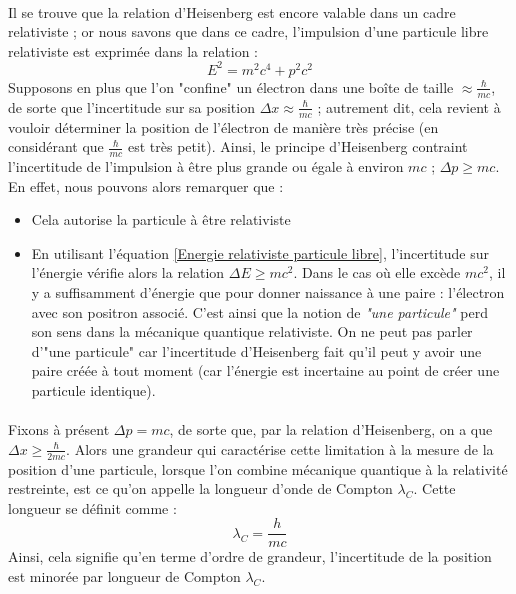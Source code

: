 \documentclass[../Notes de cours]{subfiles}
\begin{document}
\paragraph{} Il se trouve que la relation d'Heisenberg est encore valable dans un cadre relativiste ; or nous savons que dans ce cadre, l'impulsion d'une particule libre relativiste est exprimée dans la relation : 
\begin{equation}
    \label{Energie relativiste particule libre}
    E^2 = m^2 c^4 + p^2 c^2
\end{equation}
\newline Supposons en plus que l'on "confine" un électron dans une boîte de taille $\approx \frac{\hbar}{mc}$, de sorte que l'incertitude sur sa position $\Delta x \approx \frac{\hbar}{mc}$ ; autrement dit, cela revient à vouloir déterminer la position de l'électron de manière très précise (en considérant que $\frac{\hbar}{mc}$ est très petit).
\newline Ainsi, le principe d'Heisenberg contraint l'incertitude de l'impulsion à être plus grande ou égale à environ $mc$ ; $\Delta p \geq mc$. 
\newline En effet, nous pouvons alors remarquer que : 
\begin{itemize}[label=\textbullet]
\item Cela autorise la particule à être relativiste 
\item En utilisant l'équation \ref{Energie relativiste particule libre}, l'incertitude sur l'énergie vérifie alors la relation 
\newline $ \Delta E \geq mc^2$. Dans le cas où elle excède $mc^2$, il y a suffisamment d'énergie que pour donner naissance à une paire : l'électron avec son positron associé. C'est ainsi que la notion de \textit{"une particule"} perd son sens dans la mécanique quantique relativiste. On ne peut pas parler d'"une particule" car l'incertitude d'Heisenberg fait qu'il peut y avoir une paire créée à tout moment (car l'énergie est incertaine au point de créer une particule identique).
\end{itemize}

\paragraph{} Fixons à présent $\Delta p = mc$, de sorte que, par la relation d'Heisenberg, on a que $\Delta x \geq \frac{\hbar}{2mc}$. 
\newline Alors une grandeur qui caractérise cette limitation à la mesure de la position d'une particule, lorsque l'on combine mécanique quantique à la relativité restreinte, est ce qu'on appelle la longueur d'onde de Compton $\lambda_C$. Cette longueur se définit comme : \begin{equation}
    \label{longueur d'onde de compton}
    \lambda_C = \frac{h}{mc}
\end{equation}
\newline Ainsi, cela signifie qu'en terme d'ordre de grandeur, l'incertitude de la position est minorée par longueur de Compton $\lambda_C$. 
\end{document}

